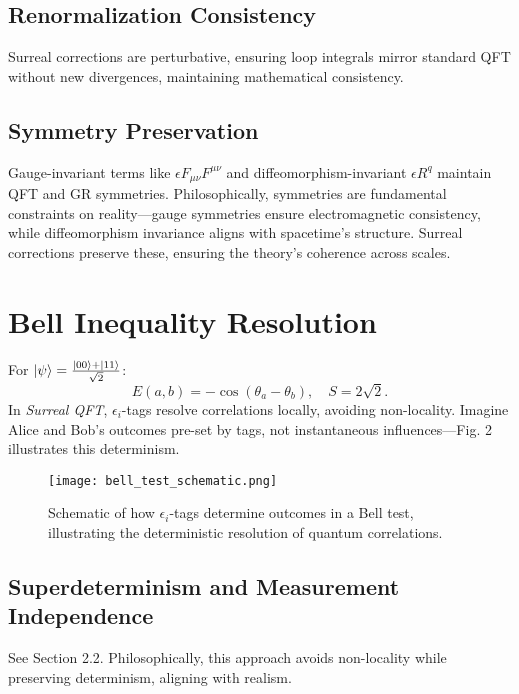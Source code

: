 \documentclass{article}
\begin{document}
\subsection{Renormalization Consistency}
Surreal corrections are perturbative, ensuring loop integrals mirror standard QFT without new divergences, maintaining mathematical consistency.

\subsection{Symmetry Preservation}
Gauge-invariant terms like \(\epsilon F_{\mu\nu} F^{\mu\nu}\) and diffeomorphism-invariant \(\epsilon R^q\) maintain QFT and GR symmetries. Philosophically, symmetries are fundamental constraints on reality—gauge symmetries ensure electromagnetic consistency, while diffeomorphism invariance aligns with spacetime's structure. Surreal corrections preserve these, ensuring the theory's coherence across scales.

\section{Bell Inequality Resolution}
For \(\ket{\psi} = \frac{\ket{00} + \ket{11}}{\sqrt{2}}\):
\begin{equation}
E(a,b) = -\cos(\theta_a - \theta_b), \quad S = 2\sqrt{2}.
\end{equation}
In \textit{Surreal QFT}, \(\epsilon_i\)-tags resolve correlations locally, avoiding non-locality. Imagine Alice and Bob's outcomes pre-set by tags, not instantaneous influences—Fig. 2 illustrates this determinism.

\begin{figure}[h]
    \centering
    \texttt{[image: bell\_test\_schematic.png]}
    \caption{Schematic of how \(\epsilon_i\)-tags determine outcomes in a Bell test, illustrating the deterministic resolution of quantum correlations.}
    \label{fig:bell_test}
\end{figure}

\subsection{Superdeterminism and Measurement Independence}
See Section 2.2. Philosophically, this approach avoids non-locality while preserving determinism, aligning with realism.
\end{document}
